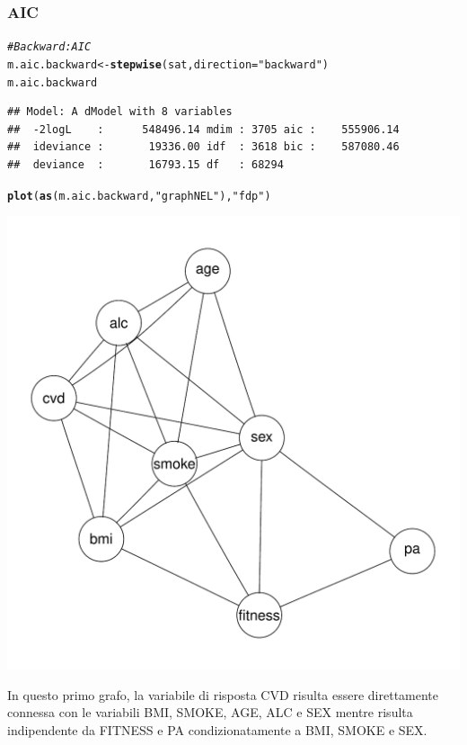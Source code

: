 \documentclass{article}\usepackage[]{graphicx}\usepackage[]{xcolor}
\makeatletter
\def\maxwidth{ %
  \ifdim\Gin@nat@width>\linewidth
    \linewidth
  \else
    \Gin@nat@width
  \fi
}
\newcommand{\hlstr}[1]{\textcolor[rgb]{0.192,0.494,0.8}{#1}}%
\newcommand{\hlcom}[1]{\textcolor[rgb]{0.678,0.584,0.686}{\textit{#1}}}%
\newcommand{\hlstd}[1]{\textcolor[rgb]{0.345,0.345,0.345}{#1}}%
\newcommand{\hlkwb}[1]{\textcolor[rgb]{0.69,0.353,0.396}{#1}}%
\newcommand{\hlkwc}[1]{\textcolor[rgb]{0.333,0.667,0.333}{#1}}%
\newcommand{\hlkwd}[1]{\textcolor[rgb]{0.737,0.353,0.396}{\textbf{#1}}}%
\newenvironment{kframe}{%
 \def\at@end@of@kframe{}%
 \ifinner\ifhmode%
  \def\at@end@of@kframe{\end{minipage}}%
  \begin{minipage}{\columnwidth}%
 \fi\fi%
 \def\FrameCommand##1{\hskip\@totalleftmargin \hskip-\fboxsep
 \colorbox{shadecolor}{##1}\hskip-\fboxsep
     \hskip-\linewidth \hskip-\@totalleftmargin \hskip\columnwidth}%
 \MakeFramed {\advance\hsize-\width
   \@totalleftmargin\z@ \linewidth\hsize
   \@setminipage}}%
 {\par\unskip\endMakeFramed%
 \at@end@of@kframe}
\newenvironment{knitrout}{}{} %
\makeatother
\begin{document}
    \subsubsection{AIC}
\begin{knitrout}
\color{fgcolor}\begin{kframe}
\begin{alltt}
\hlcom{#Backward:AIC}
\hlstd{m.aic.backward} \hlkwb{<-} \hlkwd{stepwise}\hlstd{(sat,} \hlkwc{direction}\hlstd{=}\hlstr{"backward"}\hlstd{)}
\hlstd{m.aic.backward}
\end{alltt}
\begin{verbatim}
## Model: A dModel with 8 variables
##  -2logL    :      548496.14 mdim : 3705 aic :    555906.14 
##  ideviance :       19336.00 idf  : 3618 bic :    587080.46 
##  deviance  :       16793.15 df   : 68294
\end{verbatim}
\begin{alltt}
\hlkwd{plot}\hlstd{(}\hlkwd{as}\hlstd{(m.aic.backward,} \hlstr{"graphNEL"}\hlstd{),} \hlstr{"fdp"}\hlstd{)}
\end{alltt}
\end{kframe}
\includegraphics[width=\maxwidth]{figure/Grafo_AIC_Backward-1} 
\end{knitrout}
      
      In questo primo grafo, la variabile di risposta CVD risulta essere
      direttamente connessa con le variabili BMI, SMOKE, AGE, ALC e SEX mentre
      risulta indipendente da FITNESS e PA condizionatamente a BMI, SMOKE e SEX.
      
\end{document}
